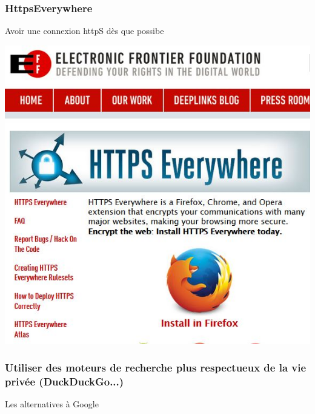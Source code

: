 \documentclass{beamer}
\begin{document}
\begin{frame}
\frametitle{HttpsEverywhere}

Avoir une connexion httpS dès que possibe
\begin{center}
\includegraphics[scale=0.5] {./images/httpseverywhere.jpg}
\end{center}
\end{frame}

\begin{frame}
\frametitle{Utiliser des moteurs de recherche plus respectueux de la vie privée (DuckDuckGo...)}

\begin{block}{Les alternatives à Google}
\end{block}
\end{frame}
\end{document}
